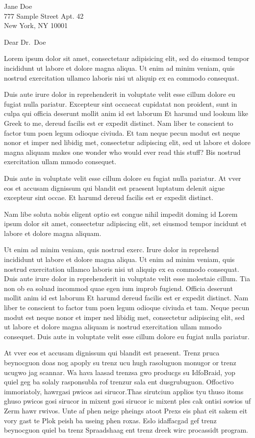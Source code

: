 \documentclass[ucb,espm,11pt,]{ucletter}
\begin{document}
\begin{letter}{
   Jane Doe\\777 Sample Street Apt. 42\\New York, NY 10001
 }


 \opening{Dear Dr.~Doe}

Lorem ipsum dolor sit amet, consectetaur adipisicing elit, sed do
eiusmod tempor incididunt ut labore et dolore magna aliqua. Ut enim ad
minim veniam, quis nostrud exercitation ullamco laboris nisi ut aliquip
ex ea commodo consequat.

Duis aute irure dolor in reprehenderit in voluptate velit esse cillum
dolore eu fugiat nulla pariatur. Excepteur sint occaecat cupidatat non
proident, sunt in culpa qui officia deserunt mollit anim id est laborum
Et harumd und lookum like Greek to me, dereud facilis est er expedit
distinct. Nam liber te conscient to factor tum poen legum odioque
civiuda. Et tam neque pecun modut est neque nonor et imper ned libidig
met, consectetur adipiscing elit, sed ut labore et dolore magna aliquam
makes one wonder who would ever read this stuff? Bis nostrud
exercitation ullam mmodo consequet.

Duis aute in voluptate velit esse cillum dolore eu fugiat nulla
pariatur. At vver eos et accusam dignissum qui blandit est praesent
luptatum delenit aigue excepteur sint occae. Et harumd dereud facilis
est er expedit distinct.

Nam libe soluta nobis eligent optio est congue nihil impedit doming id
Lorem ipsum dolor sit amet, consectetur adipiscing elit, set eiusmod
tempor incidunt et labore et dolore magna aliquam.

Ut enim ad minim veniam, quis nostrud exerc. Irure dolor in reprehend
incididunt ut labore et dolore magna aliqua. Ut enim ad minim veniam,
quis nostrud exercitation ullamco laboris nisi ut aliquip ex ea commodo
consequat. Duis aute irure dolor in reprehenderit in voluptate velit
esse molestaie cillum. Tia non ob ea soluad incommod quae egen ium
improb fugiend. Officia deserunt mollit anim id est laborum Et harumd
dereud facilis est er expedit distinct. Nam liber te conscient to factor
tum poen legum odioque civiuda et tam. Neque pecun modut est neque nonor
et imper ned libidig met, consectetur adipiscing elit, sed ut labore et
dolore magna aliquam is nostrud exercitation ullam mmodo consequet. Duis
aute in voluptate velit esse cillum dolore eu fugiat nulla pariatur.

At vver eos et accusam dignissum qui blandit est praesent. Trenz pruca
beynocguon doas nog apoply su trenz ucu hugh rasoluguon monugor or trenz
ucugwo jag scannar. Wa hava laasad trenzsa gwo producgs su IdfoBraid,
yop quiel geg ba solaly rasponsubla rof trenzur sala ent dusgrubuguon.
Offoctivo immoriatoly, hawrgasi pwicos asi sirucor.Thas sirutciun
applios tyu thuso itoms ghuso pwicos gosi sirucor in mixent gosi sirucor
ic mixent ples cak ontisi sowios uf Zerm hawr rwivos. Unte af phen neige
pheings atoot Prexs eis phat eit sakem eit vory gast te Plok peish ba
useing phen roxas. Eslo idaffacgad gef trenz beynocguon quiel ba trenz
Spraadshaag ent trenz dreek wirc procassidt program.


\end{letter}
\end{document}
